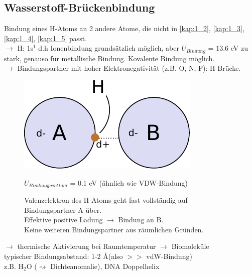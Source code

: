 \subsection{Wasserstoff-Brückenbindung} %
\label{kap:1_6}
Bindung eines H-Atoms an 2 andere Atome, die nicht in \ref{kap:1_2}, \ref{kap:1_3}, \ref{kap:1_4}, \ref{kap:1_5}%
passt.\\
$\rightarrow$ H: 1s$^1$ d.h Ionenbindung grundsätzlich möglich, aber $U_{Bindung}$ = 13.6 eV zu stark, genauso für metallische Bindung. Kovalente Bindung möglich. \\
$\rightarrow$ Bindungspartner mit hoher Elektronegativität (z.B. O, N, F): H-Brücke.
\begin{figure}[H]
	\centering
	\includegraphics{figures/1_6Wasserstoff.pdf}
	\caption{Valenzelektron des H-Atoms geht fast vollständig auf Bindungspartner A über.\\
	Effektive positive Ladung $\rightarrow$ Bindung an B.\\
	Keine weiteren Bindungspartner aus räumlichen Gründen.}
	$U_{Bindung pro Atom}$ = 0.1 eV (ähnlich wie VDW-Bindung)
	\label{}
\end{figure}

$\rightarrow$ thermische Aktivierung bei Raumtemperatur $\rightarrow$ Biomoleküle\\
typischer Bindungsabstand: 1-2 \AA (also $>>$ vdW-Bindung)\\
z.B. H$_2$O ($\rightsquigarrow$ Dichteanomalie), DNA Doppelhelix
